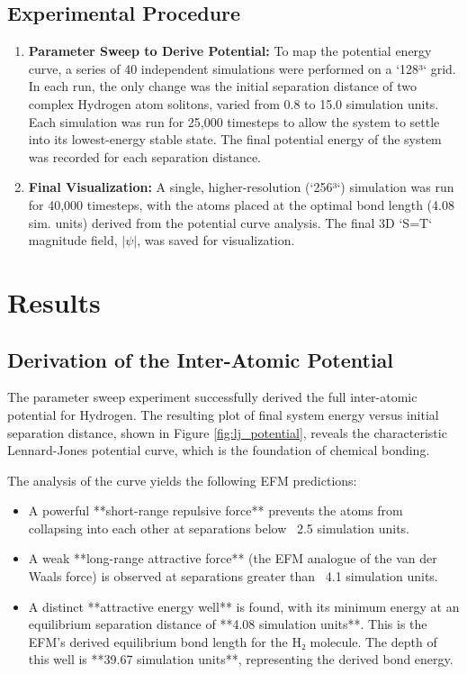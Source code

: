 \documentclass[11pt]{article}
\begin{document}
\subsection{Experimental Procedure}
\begin{enumerate}
    \item \textbf{Parameter Sweep to Derive Potential:} To map the potential energy curve, a series of 40 independent simulations were performed on a `128³` grid. In each run, the only change was the initial separation distance of two complex Hydrogen atom solitons, varied from 0.8 to 15.0 simulation units. Each simulation was run for 25,000 timesteps to allow the system to settle into its lowest-energy stable state. The final potential energy of the system was recorded for each separation distance.
    \item \textbf{Final Visualization:} A single, higher-resolution (`256³`) simulation was run for 40,000 timesteps, with the atoms placed at the optimal bond length (4.08 sim. units) derived from the potential curve analysis. The final 3D `S=T` magnitude field, \(|\psi|\), was saved for visualization.
\end{enumerate}

\section{Results}
\subsection{Derivation of the Inter-Atomic Potential}
The parameter sweep experiment successfully derived the full inter-atomic potential for Hydrogen. The resulting plot of final system energy versus initial separation distance, shown in Figure \ref{fig:lj_potential}, reveals the characteristic Lennard-Jones potential curve, which is the foundation of chemical bonding.

The analysis of the curve yields the following EFM predictions:
\begin{itemize}
    \item A powerful **short-range repulsive force** prevents the atoms from collapsing into each other at separations below ~2.5 simulation units.
    \item A weak **long-range attractive force** (the EFM analogue of the van der Waals force) is observed at separations greater than ~4.1 simulation units.
    \item A distinct **attractive energy well** is found, with its minimum energy at an equilibrium separation distance of **4.08 simulation units**. This is the EFM's derived equilibrium bond length for the H₂ molecule. The depth of this well is **39.67 simulation units**, representing the derived bond energy.
\end{itemize}
\end{document}
